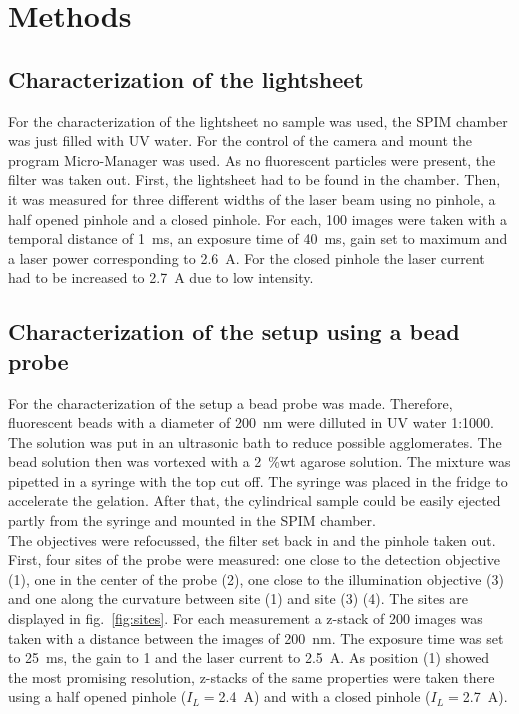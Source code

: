 \section{Methods}\label{sec:methods}
\subsection*{Characterization of the lightsheet}

For the characterization of the lightsheet no sample was used, the SPIM chamber was just filled with UV water. For the control of the camera and mount the program Micro-Manager was used. As no fluorescent particles were present, the filter was taken out. First, the lightsheet had to be found in the chamber. Then, it was measured for three different widths of the laser beam using no pinhole, a half opened pinhole and a closed pinhole. For each, 100 images were taken with a temporal distance of \SI{1}{\milli\second}, an exposure time of \SI{40}{\milli\second}, gain set to maximum and a laser power corresponding to \SI{2.6}{\ampere}. For the closed pinhole the laser current had to be increased to \SI{2.7}{\ampere} due to low intensity. 

\subsection*{Characterization of the setup using a bead probe}
For the characterization of the setup a bead probe was made. Therefore, fluorescent beads with a diameter of \SI{200}{\nano\meter} were dilluted in UV water 1:1000. The solution was put in an ultrasonic bath to reduce possible agglomerates. The bead solution then was vortexed with a \SI{2}{\percent}wt agarose solution. The mixture was pipetted in a syringe with the top cut off. The syringe was placed in the fridge to accelerate the gelation. After that, the cylindrical sample could be easily ejected partly from the syringe and mounted in the SPIM chamber.\\
The objectives were refocussed, the filter set back in and the pinhole taken out. First, four sites of the probe were measured: one close to the detection objective (1), one in the center of the probe (2), one close to the illumination objective (3) and one along the curvature between site (1) and site (3) (4). The sites are displayed in fig.~\ref{fig:sites}. For each measurement a z-stack of 200 images was taken with a distance between the images of \SI{200}{\nano\meter}. The exposure time was set to \SI{25}{\milli\second}, the gain to \num{1} and the laser current to \SI{2.5}{\ampere}. As position (1) showed the most promising resolution, z-stacks of the same properties were taken there using a half opened pinhole ($I_L=$\SI{2.4}{\ampere}) and with a closed pinhole ($I_L=$\SI{2.7}{\ampere}).

